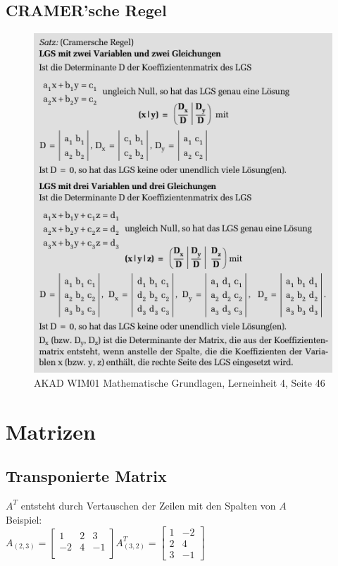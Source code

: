 \documentclass[a4paper,12pt]{scrartcl}
\begin{document}
\newpage
\subsection{CRAMER'sche Regel}
\begin{figure}[ht]
	\centering
  \includegraphics[width=1.0\textwidth]{wim01-zusammenfassung_cramersche_regel.png}
	\caption{AKAD WIM01 Mathematische Grundlagen, Lerneinheit 4, Seite 46}
	\label{fig01}
\end{figure}

\newpage
\section{Matrizen}
\subsection{Transponierte Matrix}
$A^T$ entsteht durch Vertauschen der Zeilen mit den Spalten von $A$\\

Beispiel: \\
$A_{(2,3)} = 
\begin{bmatrix}
 1 & 2 & 3\\
 -2 & 4 & -1 \\
\end{bmatrix}
A_{(3,2)}^T = 
\begin{bmatrix}
 1 & -2\\
 2 & 4\\
 3 & -1
\end{bmatrix}
$
\end{document}
